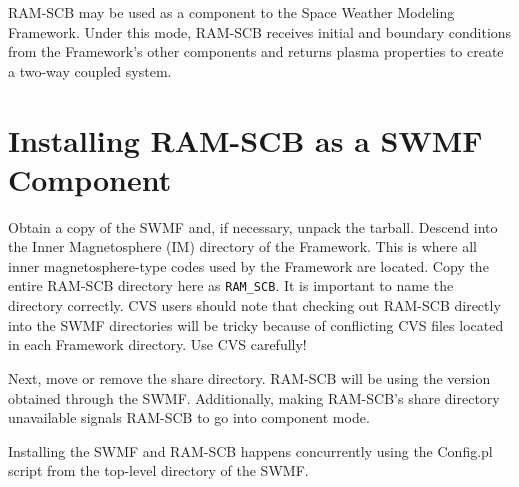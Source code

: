RAM-SCB may be used as a component to the Space Weather Modeling Framework. Under this mode, RAM-SCB receives initial and boundary conditions from the Framework's other components and returns plasma properties to create a two-way coupled system.


\section{Installing RAM-SCB as a SWMF Component}
 
Obtain a copy of the SWMF and, if necessary, unpack the tarball.  Descend into the Inner Magnetosphere (IM) directory of the Framework.  This is where all inner magnetosphere-type codes used by the Framework are located.  Copy the entire RAM-SCB directory here as {\tt RAM\_SCB}.  It is important to name the directory correctly. CVS users should note that checking out RAM-SCB directly into the SWMF directories will be tricky because of conflicting CVS files located in each Framework directory. Use CVS carefully! 

Next, move or remove the share directory. RAM-SCB will be using the version obtained through the SWMF. Additionally, making RAM-SCB's share directory unavailable signals RAM-SCB to go into component mode.

Installing the SWMF and RAM-SCB happens concurrently using the Config.pl script from the top-level directory of the SWMF.  

